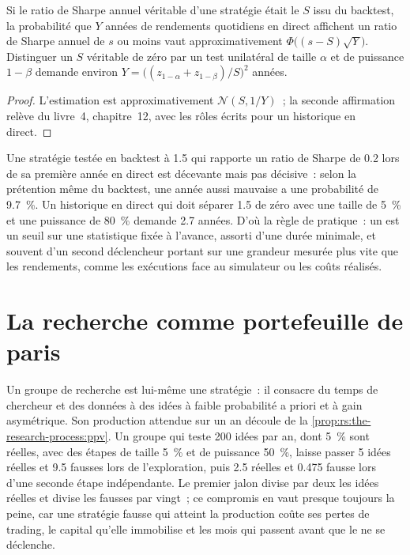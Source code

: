 \begin{proposition}\label{prop:rs:the-research-process:kill}
Si le ratio de Sharpe annuel véritable d'une stratégie était le $S$ issu du backtest, la probabilité que $Y$ années de rendements quotidiens en direct affichent un
ratio de Sharpe annuel de $s$ ou moins vaut approximativement $\Phi\bigl((s - S)\sqrt Y\bigr)$. Distinguer un $S$ véritable de zéro par un
test unilatéral de taille $\alpha$ et de puissance $1 - \beta$ demande environ $Y = \bigl((z_{1-\alpha} + z_{1-\beta})/S\bigr)^2$ années.
\end{proposition}

\begin{proof}
L'estimation est approximativement $\mathcal N(S, 1/Y)$~; la seconde affirmation relève du livre~4, chapitre~12, avec les rôles écrits pour un
historique en direct.
\end{proof}

Une stratégie testée en backtest à 1.5 qui rapporte un ratio de Sharpe de 0.2 lors de sa première année en direct est décevante mais pas décisive~:
selon la prétention même du backtest, une année aussi mauvaise a une probabilité de 9.7~\%. Un historique en direct qui doit séparer 1.5 de zéro avec une taille de 5~\%
et une puissance de 80~\% demande 2.7 années. D'où la règle de pratique~: un  est un seuil sur une statistique fixée
à l'avance, assorti d'une durée minimale, et souvent d'un second déclencheur portant sur une grandeur mesurée plus vite que les rendements, comme
les exécutions face au simulateur ou les coûts réalisés.

\section{La recherche comme portefeuille de paris}

Un groupe de recherche est lui-même une stratégie~: il consacre du temps de chercheur et des données à des idées à faible probabilité a priori et à gain asymétrique. Son
production attendue sur un an découle de la \cref{prop:rs:the-research-process:ppv}. Un groupe qui teste 200 idées par an, dont
5~\% sont réelles, avec des étapes de taille 5~\% et de puissance 50~\%, laisse passer 5 idées réelles et 9.5 fausses lors de l'exploration, puis 2.5 réelles
et 0.475 fausse lors d'une seconde étape indépendante. Le premier jalon divise par deux les idées réelles et divise les fausses par vingt~;
ce compromis en vaut presque toujours la peine, car une stratégie fausse qui atteint la production coûte ses pertes de trading, le
capital qu'elle immobilise et les mois qui passent avant que le  ne se déclenche.


